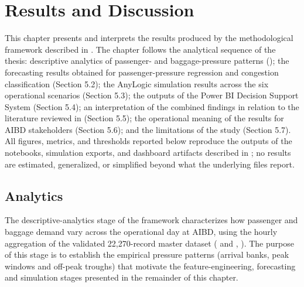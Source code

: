 \chapter{Results and Discussion}
\label{chap:results-discussion}

This chapter presents and interprets the results produced by the methodological framework described in . The chapter follows the analytical sequence of the thesis: descriptive analytics of passenger- and baggage-pressure patterns (); the forecasting results obtained for passenger-pressure regression and congestion classification (Section 5.2); the AnyLogic simulation results across the six operational scenarios (Section 5.3); the outputs of the Power BI Decision Support System (Section 5.4); an interpretation of the combined findings in relation to the literature reviewed in  (Section 5.5); the operational meaning of the results for AIBD stakeholders (Section 5.6); and the limitations of the study (Section 5.7). All figures, metrics, and thresholds reported below reproduce the outputs of the notebooks, simulation exports, and dashboard artifacts described in ; no results are estimated, generalized, or simplified beyond what the underlying files report.

\section{Analytics}
\label{sec:analytics}

The descriptive-analytics stage of the framework characterizes how passenger and baggage demand vary across the operational day at AIBD, using the hourly aggregation of the validated 22,270-record master dataset ( and , ). The purpose of this stage is to establish the empirical pressure patterns (arrival banks, peak windows and off-peak troughs) that motivate the feature-engineering, forecasting and simulation stages presented in the remainder of this chapter.


